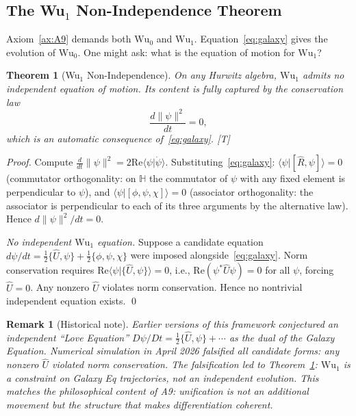 \documentclass[11pt, a4paper]{article}
\newtheorem{theorem}{Theorem}
\newtheorem*{remark}{Remark}
\newcommand{\Hq}{\mathbb{H}}
\newcommand{\Reop}{\hat{R}}
\newcommand{\Wuz}{\mathrm{Wu}_0}
\newcommand{\Wuo}{\mathrm{Wu}_1}
\newcommand{\norm}[1]{\lVert #1 \rVert}
\newcommand{\braket}[2]{\langle #1 | #2 \rangle}
\newcommand{\re}{\mathrm{Re}}
\begin{document}
\subsection{The Wu$_1$ Non-Independence Theorem}

Axiom~\ref{ax:A9} demands both $\Wuz$ and $\Wuo$. Equation~\eqref{eq:galaxy}
gives the evolution of $\Wuz$. One might ask: what is the equation of
motion for $\Wuo$?

\begin{theorem}[Wu$_1$ Non-Independence]
\label{thm:wu1_nonind}
On any Hurwitz algebra, $\Wuo$ admits \emph{no} independent
equation of motion. Its content is fully captured by the conservation
law
\begin{equation}
\boxed{\;\frac{d\norm{\psi}^2}{dt} = 0,\;}
\label{eq:norm_conservation}
\end{equation}
which is an automatic consequence of~\eqref{eq:galaxy}. [T]
\end{theorem}

\begin{proof}
Compute $\tfrac{d}{dt}\norm{\psi}^2 = 2\re\braket{\psi}{\dot\psi}$.
Substituting~\eqref{eq:galaxy}:
$\braket{\psi}{[\Reop,\psi]} = 0$ (commutator orthogonality: on $\Hq$
the commutator of $\psi$ with any fixed element is perpendicular to
$\psi$), and $\braket{\psi}{[\phi,\psi,\chi]} = 0$ (associator
orthogonality: the associator is perpendicular to each of its three
arguments by the alternative law). Hence
$d\norm{\psi}^2/dt = 0$.

\emph{No independent $\Wuo$ equation.} Suppose a candidate equation
$d\psi/dt = \tfrac{1}{2}\{\hat{U}, \psi\} + \tfrac{1}{2}\{\phi, \psi, \chi\}$
were imposed alongside~\eqref{eq:galaxy}. Norm conservation requires
$\re\braket{\psi}{\{\hat{U},\psi\}} = 0$, i.e., $\re(\psi^* \hat{U} \psi) = 0$
for all $\psi$, forcing $\hat{U} = 0$. Any nonzero $\hat{U}$ violates
norm conservation. Hence no nontrivial independent equation exists.
\qed
\end{proof}

\begin{remark}[Historical note]
Earlier versions of this framework conjectured an independent ``Love
Equation'' $D\psi/Dt = \tfrac{1}{2}\{\hat{U}, \psi\} + \cdots$ as the
dual of the Galaxy Equation. Numerical simulation in April 2026
falsified all candidate forms: any nonzero $\hat{U}$ violated norm
conservation. The falsification led to Theorem~\ref{thm:wu1_nonind}:
$\Wuo$ is a \emph{constraint} on Galaxy Eq trajectories, not an
independent evolution. This matches the philosophical content of A9:
unification is not an additional movement but the structure that
makes differentiation coherent.
\end{remark}
\end{document}
